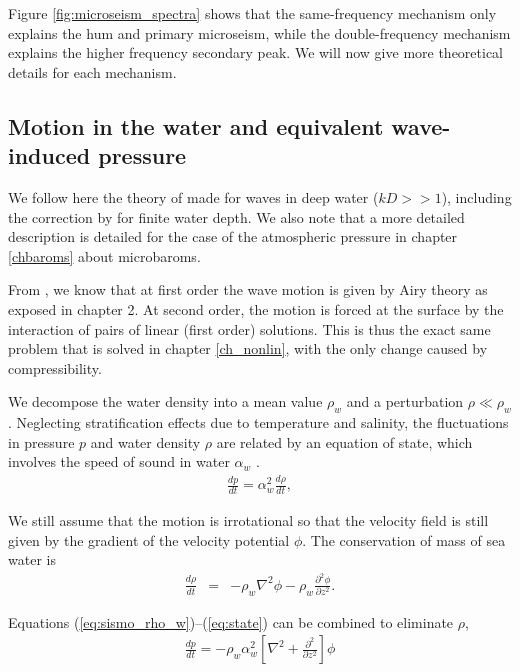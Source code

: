Figure \ref{fig:microseism_spectra} shows that the same-frequency mechanism only  explains the hum and primary microseism, while the double-frequency mechanism explains the 
higher frequency secondary peak.  We will now give more theoretical details for each mechanism.


\subsection{Motion in the water and equivalent wave-induced pressure}
We follow here the theory of \cite{Hasselmann1963c} made for waves in deep water ($kD >> 1$), including the correction by \cite{Ardhuin&Herbers2013} for  finite water depth. We also note that a more detailed description is detailed for the case of the atmospheric pressure in chapter \ref{chbaroms} about microbaroms. 

From \cite{Longuet-Higgins1950}, we know that at first order the wave motion is given by Airy theory as exposed in chapter 2. 
At second order, the motion is forced at the surface by the interaction of pairs of linear (first order) solutions. This is thus the exact same problem that is solved in chapter \ref{ch_nonlin}, 
with the only change caused by compressibility. 

We decompose the water density into a mean value
$\rho_w$ and a perturbation $\rho \ll \rho_w$. 
Neglecting stratification effects due to temperature and salinity, 
the fluctuations in pressure $p$ and water density $\rho$ are related by an equation of state, 
which involves the speed of sound in water $\alpha_w$ \citep[][eq. 32]{Lighthill1978}.
\begin{eqnarray}
  \frac{d p}{d t}= \alpha_w^2 \frac{d \rho}{d t} \label{eq:state},
\end{eqnarray}

We still assume that the motion is irrotational so that the velocity field is still given by the gradient of 
the velocity potential $\phi$.  
The conservation of mass of sea water is 
\begin{eqnarray}
\frac{d \rho}{d t}&=& - \rho_w \nabla^2 \phi - \rho_w \frac{\partial^2 \phi}{\partial z^2}  \label{eq:sismo_rho_w}.
\end{eqnarray}


Equations (\ref{eq:sismo_rho_w})--(\ref{eq:state}) can be combined to eliminate $\rho$, 
\begin{eqnarray}
\frac{d p}{d t}=   -\rho_w \alpha_w^2 \left[ 
\nabla^2 + \frac{\partial^2 }{\partial z^2}\right] \phi \label{eq:sismo_p_w2a}
\end{eqnarray}

